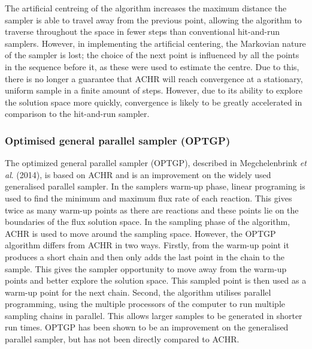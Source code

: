 \documentclass[10pt,letterpaper]{article}
\begin{document}
The artificial centreing of the algorithm increases the maximum distance the sampler is able to travel away from the previous point, allowing the algorithm to traverse throughout the space in fewer steps than conventional hit-and-run samplers. However, in implementing the artificial centering, the Markovian nature of the sampler is lost; the choice of the next point is influenced by all the points in the sequence before it, as these were used to estimate the centre. Due to this, there is no longer a guarantee that ACHR will reach convergence at a stationary, uniform sample in a finite amount of steps. However, due to its ability to explore the solution space more quickly, convergence is likely to be greatly accelerated in comparison to the hit-and-run sampler\cite{Kaufman}.

\subsubsection*{Optimised general parallel sampler (OPTGP)}
The optimized general parallel sampler (OPTGP), described in Megchelenbrink \textit{et al}. (2014), is based on ACHR and is an improvement on the widely used generalised parallel sampler\cite{Schellenberger2011}\cite{Megchelenbrink}. In the samplers warm-up phase, linear programing is used to find the minimum and maximum flux rate of each reaction. This gives twice as many warm-up points as there are reactions and these points lie on the boundaries of the flux solution space. In the sampling phase of the algorithm, ACHR is used to move around the sampling space. However, the OPTGP algorithm differs from ACHR in two ways. Firstly, from the warm-up point it produces a short chain and then only adds the last point in the chain to the sample. This gives the sampler opportunity to move away from the warm-up points and better explore the solution space. This sampled point is then used as a warm-up point for the next chain. Second, the algorithm utilises parallel programming, using the multiple processors of the computer to run multiple sampling chains in parallel. This allows larger samples to be generated in shorter run times\cite{Megchelenbrink}. OPTGP has been shown to be an improvement on the generalised parallel sampler, but has not been directly compared to ACHR.
\end{document}
